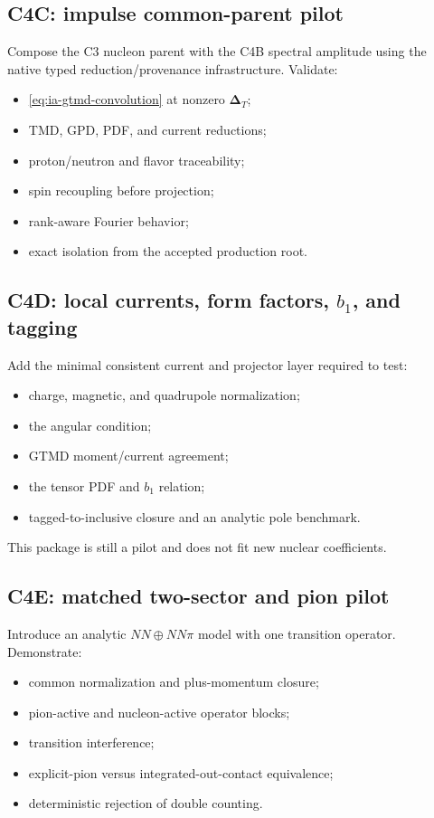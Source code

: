 \documentclass[11pt]{article}
\newcommand{\DT}{\bm{\Delta}_{T}}
\begin{document}
\subsection{C4C: impulse common-parent pilot}

Compose the C3 nucleon parent with the C4B spectral amplitude using the native
typed reduction/provenance infrastructure.  Validate:
\begin{itemize}
\item \cref{eq:ia-gtmd-convolution} at nonzero \(\DT\);
\item TMD, GPD, PDF, and current reductions;
\item proton/neutron and flavor traceability;
\item spin recoupling before projection;
\item rank-aware Fourier behavior;
\item exact isolation from the accepted production root.
\end{itemize}

\subsection{C4D: local currents, form factors, \texorpdfstring{\(b_1\)}{b1}, and tagging}

Add the minimal consistent current and projector layer required to test:
\begin{itemize}
\item charge, magnetic, and quadrupole normalization;
\item the angular condition;
\item GTMD moment/current agreement;
\item the tensor PDF and \(b_1\) relation;
\item tagged-to-inclusive closure and an analytic pole benchmark.
\end{itemize}
This package is still a pilot and does not fit new nuclear coefficients.

\subsection{C4E: matched two-sector and pion pilot}

Introduce an analytic \(NN\oplus NN\pi\) model with one transition operator.
Demonstrate:
\begin{itemize}
\item common normalization and plus-momentum closure;
\item pion-active and nucleon-active operator blocks;
\item transition interference;
\item explicit-pion versus integrated-out-contact equivalence;
\item deterministic rejection of double counting.
\end{itemize}
\end{document}
